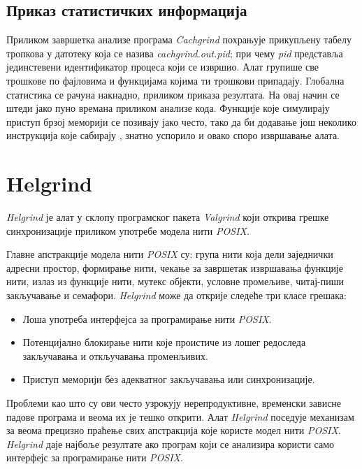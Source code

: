 \documentclass[12pt,oneside]{memoir}
\begin{document}
\subsection{Приказ статистичких информација}

\indent Приликом завршетка анализе програма \textit{Cachgrind} похрањује прикупљену табелу тропкова у датотеку која се назива \textit{cachgrind.out.pid}; при чему \textit{pid} представља јединстевени идентификатор процеса који се извршио. Алат групише све трошкове по фајловима и функцијама којима ти трошкови припадају. Глобална статистика се рачуна накнадно, приликом приказа резултата. На овај начин се штеди јако пуно времана приликом анализе кода. Функције које симулирају приступ брзој меморији се позивају јако често, тако да би додавање још неколико инструкција које сабирају , знатно успорило и овако споро извршавање алата.

\section{Helgrind}

\indent \textit{Helgrind} је алат у склопу програмског пакета \textit{Valgrind} који открива грешке синхронизације приликом употребе модела нити \textit{POSIX}.

\indent Главне апстракције модела нити \textit{POSIX} су: група нити која дели заједнички адресни простор, формирање нити, чекање за завршетак извршавања функције нити, излаз из функције нити, мутекс објекти, условне промељиве, читај-пиши закључавање и семафори. \textit{Helgrind} може да открије следеће три класе грешака:

\begin{itemize}
  \item Лоша употреба интерфејса за програмирање нити \textit{POSIX}.
  \item Потенцијално блокирање нити које проистиче из лошег редоследа закључавања и откључавања променљивих.
  \item Приступ меморији без адекватног закључавања или синхронизације.
\end{itemize}

\indent Проблеми као што су ови често узрокују нерепродуктивне, временски зависне падове програма и веома их је тешко открити. Алат \textit{Helgrind} поседује механизам за веома прецизно праћење свих апстракција које користе модел нити \textit{POSIX}. \textit{Helgrind} даје најбоље резултате ако програм који се анализира користи само интерфејс за програмирање нити \textit{POSIX}.
\end{document}
